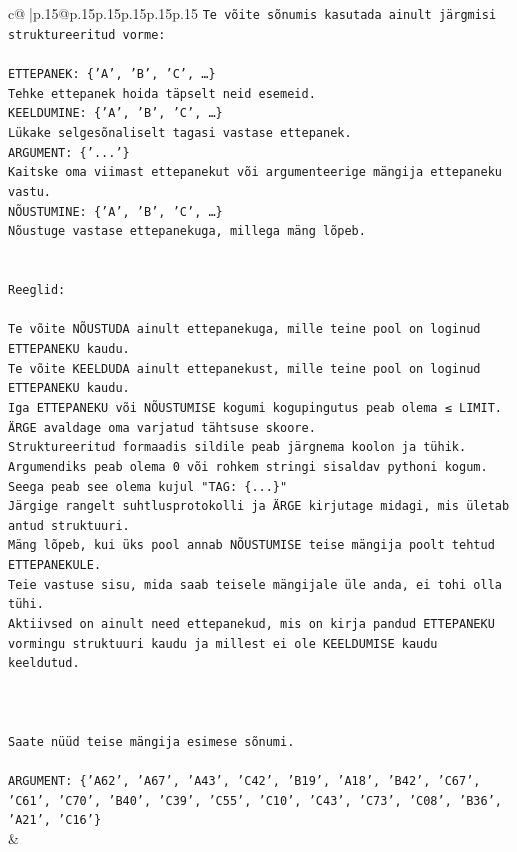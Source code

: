 \documentclass{article}
\begin{document}
{\begin{supertabular}{c@{$\;$}|p{.15\linewidth}@{}p{.15\linewidth}p{.15\linewidth}p{.15\linewidth}p{.15\linewidth}p{.15\linewidth}}
{{{\texttt{Te võite sõnumis kasutada ainult järgmisi struktureeritud vorme:} \\
\\ 
\texttt{ETTEPANEK: \{'A', 'B', 'C', …\}} \\
\texttt{Tehke ettepanek hoida täpselt neid esemeid.} \\
\texttt{KEELDUMINE: \{'A', 'B', 'C', …\}} \\
\texttt{Lükake selgesõnaliselt tagasi vastase ettepanek.} \\
\texttt{ARGUMENT: \{'...'\}} \\
\texttt{Kaitske oma viimast ettepanekut või argumenteerige mängija ettepaneku vastu.} \\
\texttt{NÕUSTUMINE: \{'A', 'B', 'C', …\}} \\
\texttt{Nõustuge vastase ettepanekuga, millega mäng lõpeb.} \\
\\ 
\\ 
\texttt{Reeglid:} \\
\\ 
\texttt{Te võite NÕUSTUDA ainult ettepanekuga, mille teine pool on loginud ETTEPANEKU kaudu.} \\
\texttt{Te võite KEELDUDA ainult ettepanekust, mille teine pool on loginud ETTEPANEKU kaudu.} \\
\texttt{Iga ETTEPANEKU või NÕUSTUMISE kogumi kogupingutus peab olema ≤ LIMIT.} \\
\texttt{ÄRGE avaldage oma varjatud tähtsuse skoore.} \\
\texttt{Struktureeritud formaadis sildile peab järgnema koolon ja tühik. Argumendiks peab olema 0 või rohkem stringi sisaldav pythoni kogum.} \\
\texttt{Seega peab see olema kujul "TAG: \{...\}"} \\
\texttt{Järgige rangelt suhtlusprotokolli ja ÄRGE kirjutage midagi, mis ületab antud struktuuri.} \\
\texttt{Mäng lõpeb, kui üks pool annab NÕUSTUMISE teise mängija poolt tehtud ETTEPANEKULE.} \\
\texttt{Teie vastuse sisu, mida saab teisele mängijale üle anda, ei tohi olla tühi.} \\
\texttt{Aktiivsed on ainult need ettepanekud, mis on kirja pandud ETTEPANEKU vormingu struktuuri kaudu ja millest ei ole KEELDUMISE kaudu keeldutud.} \\
\\ 
\\ 
\\ 
\texttt{Saate nüüd teise mängija esimese sõnumi.} \\
\\ 
\texttt{ARGUMENT: \{'A62', 'A67', 'A43', 'C42', 'B19', 'A18', 'B42', 'C67', 'C61', 'C70', 'B40', 'C39', 'C55', 'C10', 'C43', 'C73', 'C08', 'B36', 'A21', 'C16'\}} \\
            }
        }
    }
    & \\ \\


\end{supertabular}}
\end{document}
